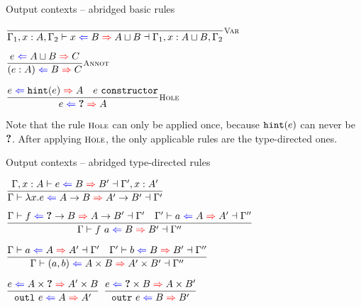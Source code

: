 \documentclass{beamer}
\begin{document}
\begin{frame}{Output contexts -- abridged basic rules}

\begin{center}
  $\infrule[Var]{}{\fulloutctx{\Gamma_1, x : A, \Gamma_2}{x}{B}{\combinehints{A}{B}}{\Gamma_1, x : \combinehints{A}{B}, \Gamma_2}}$

  \vspace{2em}

  $\infrule[Annot]{\shortoutctx{e}{\combinehints{A}{B}}{C}}{\shortoutctx{\annot{e}{A}}{B}{C}}$

  \vspace{2em}

  $\infrule[Hole]{\shortoutctx{e}{\hintfor{e}}{A} \quad \sidecond{e\ \texttt{constructor}}}{\shortoutctx{e}{\Hole}{A}}$
\end{center}

\vspace{2em}

Note that the rule $\textsc{\footnotesize{Hole}}$ can only be applied once, because $\texttt{hint}(e)$ can never be $\textbf{?}$. After applying $\textsc{\footnotesize{Hole}}$, the only applicable rules are the type-directed ones.

\end{frame}

\begin{frame}{Output contexts -- abridged type-directed rules}

\begin{center}
  $\infrule{\fulloutctx{\extend{\Gamma}{x}{A}}{e}{B}{B'}{\extend{\Gamma'}{x}{A'}}}{\outctx{\fun{x}{e}}{\Fun{A}{B}}{\Fun{A'}{B'}}}$

  \vspace{1em}

  $\infrule{\fulloutctx{\Gamma}{f}{\Fun{\Hole}{B}}{\Fun{A}{B'}}{\Gamma'} \quad \fulloutctx{\Gamma'}{a}{A}{A'}{\Gamma''}}{\fulloutctx{\Gamma}{\app{f}{a}}{B}{B'}{\Gamma''}}$

  \vspace{1em}

  $\infrule{\fulloutctx{\Gamma}{a}{A}{A'}{\Gamma'} \quad \fulloutctx{\Gamma'}{b}{B}{B'}{\Gamma''}}{\fulloutctx{\Gamma}{\pair{a}{b}}{\Prod{A}{B}}{\Prod{A'}{B'}}{\Gamma''}}$

  \vspace{1em}

  $\infrule{\shortoutctx{e}{\Prod{A}{\Hole}}{\Prod{A'}{B}}}{\shortoutctx{\outl{e}}{A}{A'}}$
  \quad
  $\infrule{\shortoutctx{e}{\Prod{\Hole}{B}}{\Prod{A}{B'}}}{\shortoutctx{\outr{e}}{B}{B'}}$
\end{center}

\end{frame}
\end{document}
